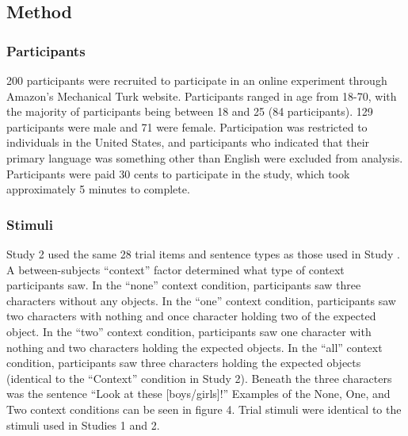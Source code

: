 \documentclass[man]{apa2}
\begin{document}
\subsection{Method}

\subsubsection{Participants}
200 participants were recruited to participate in an online experiment through Amazon's Mechanical Turk website.  Participants ranged in age from 18-70, with the majority of participants being between 18 and 25 (84 participants).  129 participants were male and 71 were female.  Participation was restricted to individuals in the United States, and participants who indicated that their primary language was something other than English were excluded from analysis.  Participants were paid 30 cents to participate in the study, which took approximately 5 minutes to complete.  

\subsubsection{Stimuli}
Study 2 used the same 28 trial items and sentence types as those used in Study .  A between-subjects ``context'' factor determined what type of context participants saw.  In the ``none'' context condition, participants saw three characters without any objects.  In the ``one'' context condition, participants saw two characters with nothing and once character holding two of the expected object.  In the ``two'' context condition, participants saw one character with nothing and two characters holding the expected objects.  In the ``all'' context condition, participants saw three characters holding the expected objects (identical to the ``Context'' condition in Study 2).  Beneath the three characters was the sentence ``Look at these [boys/girls]!''  Examples of the None, One, and Two context conditions can be seen in figure 4.  Trial stimuli were identical to the stimuli used in Studies 1 and 2.  
\end{document}
